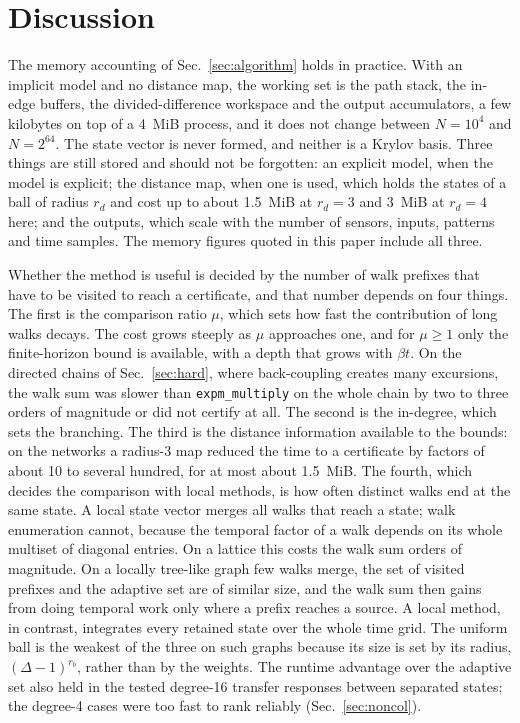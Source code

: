 \documentclass[aps,pra,superscriptaddress,floatfix,longbibliography,twocolumn]{revtex4-2}
\begin{document}
\section{Discussion}\label{sec:discussion}

The memory accounting of Sec.~\ref{sec:algorithm} holds in practice. With an implicit model and no distance map, the working set is the path stack, the in-edge buffers, the divided-difference workspace and the output accumulators, a few kilobytes on top of a 4~MiB process, and it does not change between $N=10^4$ and $N=2^{64}$. The state vector is never formed, and neither is a Krylov basis. Three things are still stored and should not be forgotten: an explicit model, when the model is explicit; the distance map, when one is used, which holds the states of a ball of radius $r_d$ and cost up to about 1.5~MiB at $r_d=3$ and 3~MiB at $r_d=4$ here; and the outputs, which scale with the number of sensors, inputs, patterns and time samples. The memory figures quoted in this paper include all three.

Whether the method is useful is decided by the number of walk prefixes that have to be visited to reach a certificate, and that number depends on four things. The first is the comparison ratio $\mu$, which sets how fast the contribution of long walks decays. The cost grows steeply as $\mu$ approaches one, and for $\mu\ge1$ only the finite-horizon bound is available, with a depth that grows with $\beta t$. On the directed chains of Sec.~\ref{sec:hard}, where back-coupling creates many excursions, the walk sum was slower than \texttt{expm\_multiply} on the whole chain by two to three orders of magnitude or did not certify at all. The second is the in-degree, which sets the branching. The third is the distance information available to the bounds: on the networks a radius-3 map reduced the time to a certificate by factors of about 10 to several hundred, for at most about 1.5~MiB. The fourth, which decides the comparison with local methods, is how often distinct walks end at the same state. A local state vector merges all walks that reach a state; walk enumeration cannot, because the temporal factor of a walk depends on its whole multiset of diagonal entries. On a lattice this costs the walk sum orders of magnitude. On a locally tree-like graph few walks merge, the set of visited prefixes and the adaptive set are of similar size, and the walk sum then gains from doing temporal work only where a prefix reaches a source. A local method, in contrast, integrates every retained state over the whole time grid. The uniform ball is the weakest of the three on such graphs because its size is set by its radius, $(\Delta-1)^{r_b}$, rather than by the weights. The runtime advantage over the adaptive set also held in the tested degree-16 transfer responses between separated states; the degree-4 cases were too fast to rank reliably (Sec.~\ref{sec:noncol}).
\end{document}
